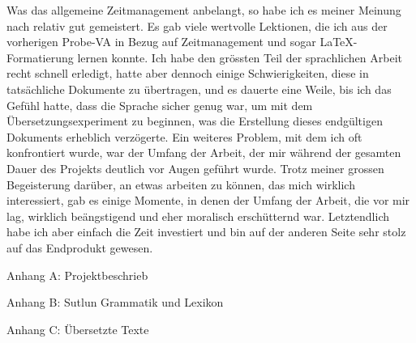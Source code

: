 \documentclass{article}
\begin{document}
Was das allgemeine Zeitmanagement anbelangt, so habe ich es meiner Meinung nach relativ gut gemeistert.
Es gab viele wertvolle Lektionen, die ich aus der vorherigen Probe-VA in Bezug auf Zeitmanagement
und sogar \LaTeX-Formatierung lernen konnte. Ich habe den grössten Teil der sprachlichen Arbeit recht
schnell erledigt, hatte aber dennoch einige Schwierigkeiten, diese in tatsächliche Dokumente zu übertragen,
und es dauerte eine Weile, bis ich das Gefühl hatte, dass die Sprache sicher genug war,
um mit dem Übersetzungsexperiment zu beginnen, was die Erstellung dieses endgültigen Dokuments erheblich verzögerte.
Ein weiteres Problem, mit dem ich oft konfrontiert wurde, war der Umfang der Arbeit,
der mir während der gesamten Dauer des Projekts deutlich vor Augen geführt wurde.
Trotz meiner grossen Begeisterung darüber, an etwas arbeiten zu können, das mich wirklich interessiert,
gab es einige Momente, in denen der Umfang der Arbeit, die vor mir lag, wirklich beängstigend und eher
moralisch erschütternd war. Letztendlich habe ich aber einfach die Zeit investiert und bin auf der anderen
Seite sehr stolz auf das Endprodukt gewesen.







\renewcommand{\section}[1]{\newpage\vspace*{\fill}\Huge{#1}\vspace*{\fill}}

\section{Anhang A: Projektbeschrieb}


\section{Anhang B: Sutlun Grammatik und Lexikon}


\section{Anhang C: Übersetzte Texte}

\end{document}
